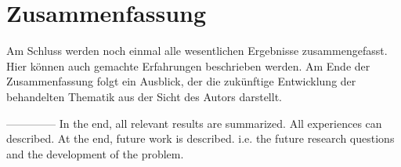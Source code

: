 \chapter{Zusammenfassung}

Am Schluss werden noch einmal alle wesentlichen Ergebnisse
zusammengefasst.  Hier können auch gemachte Erfahrungen beschrieben
werden.  Am Ende der Zusammenfassung folgt ein Ausblick,
der die zukünftige Entwicklung der behandelten Thematik aus der Sicht
des Autors darstellt.


--------------
\newline
In the end, all relevant results are summarized. All experiences can
described. At the end, future work is described. i.e. the future research questions
and the development of the problem.
